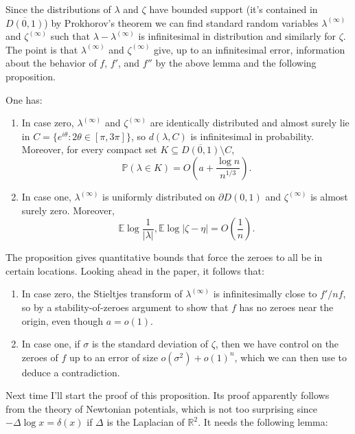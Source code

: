 \documentclass[12pt]{article}
\newcommand{\RR}{\mathbb{R}}
\newcommand{\PP}{\mathbb P}
\newcommand{\EE}{\mathbb E}
\begin{document}
Since the distributions of $\lambda$ and $\zeta$ have bounded support (it's contained in $\overline{D(0, 1)}$) by Prokhorov's theorem we can find standard random variables $\lambda^{(\infty)}$ and $\zeta^{(\infty)}$ such that $\lambda - \lambda^{(\infty)}$ is infinitesimal in distribution and similarly for $\zeta$.
The point is that $\lambda^{(\infty)}$ and $\zeta^{(\infty)}$ give, up to an infinitesimal error, information about the behavior of $f$, $f'$, and $f''$ by the above lemma and the following proposition.

\begin{proposition}
One has:
\begin{enumerate}
\item In case zero, $\lambda^{(\infty)}$ and $\zeta^{(\infty)}$ are identically distributed and almost surely lie in $C = \{e^{i\theta}: 2\theta \in [\pi, 3\pi]\}$, so $d(\lambda, C)$ is infinitesimal in probability. Moreover, for every compact set $K \subseteq \overline{D(0, 1)} \setminus C$,
$$\PP(\lambda \in K) = O\left(a + \frac{\log n}{n^{1/3}}\right).$$
\item In case one, $\lambda^{(\infty)}$ is uniformly distributed on $\partial D(0, 1)$ and $\zeta^{(\infty)}$ is almost surely zero. Moreover,
$$\EE \log \frac{1}{|\lambda|}, \EE\log |\zeta - \eta| = O\left(\frac{1}{n}\right).$$
\end{enumerate}
\end{proposition}

The proposition gives quantitative bounds that force the zeroes to all be in certain locations.
Looking ahead in the paper, it follows that:
\begin{enumerate}
\item In case zero, the Stieltjes transform of $\lambda^{(\infty)}$ is infinitesimally close to $f'/nf$, so by a stability-of-zeroes argument to show that $f$ has no zeroes near the origin, even though $a = o(1)$.
\item In case one, if $\sigma$ is the standard deviation of $\zeta$, then we have control on the zeroes of $f$ up to an error of size $o(\sigma^2) + o(1)^n$, which we can then use to deduce a contradiction.
\end{enumerate}

Next time I'll start the proof of this proposition. Its proof apparently follows from the theory of Newtonian potentials, which is not too surprising since $-\Delta \log x = \delta(x)$ if $\Delta$ is the Laplacian of $\RR^2$.
It needs the following lemma:
\end{document}
